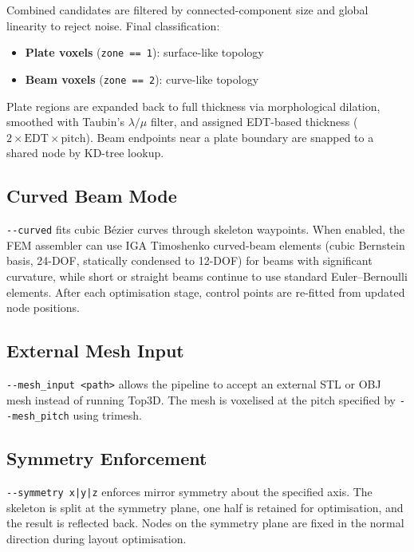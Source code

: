\documentclass[a4paper, 11pt, openany]{report}
\begin{document}
Combined candidates are filtered by connected-component size and global
linearity to reject noise.  Final classification:
\begin{itemize}[nosep]
    \item \textbf{Plate voxels} (\texttt{zone == 1}): surface-like topology
    \item \textbf{Beam voxels} (\texttt{zone == 2}): curve-like topology
\end{itemize}

Plate regions are expanded back to full thickness via morphological dilation,
smoothed with Taubin's $\lambda/\mu$ filter, and assigned EDT-based thickness
($2 \times \text{EDT} \times \text{pitch}$).  Beam endpoints near a plate
boundary are snapped to a shared node by KD-tree lookup.


\subsection{Curved Beam Mode}

\texttt{-{}-curved} fits cubic B\'ezier curves through skeleton waypoints.
When enabled, the FEM assembler can use IGA Timoshenko curved-beam elements
(cubic Bernstein basis, 24-DOF, statically condensed to 12-DOF) for beams with
significant curvature, while short or straight beams continue to use standard
Euler--Bernoulli elements.  After each optimisation stage, control points are
re-fitted from updated node positions.


\subsection{External Mesh Input}

\texttt{-{}-mesh\_input <path>} allows the pipeline to accept an external STL
or OBJ mesh instead of running Top3D.  The mesh is voxelised at the pitch
specified by \texttt{-{}-mesh\_pitch} using trimesh.


\subsection{Symmetry Enforcement}

\texttt{-{}-symmetry x|y|z} enforces mirror symmetry about the specified axis.
The skeleton is split at the symmetry plane, one half is retained for
optimisation, and the result is reflected back.  Nodes on the symmetry plane are
fixed in the normal direction during layout optimisation.


\end{document}
